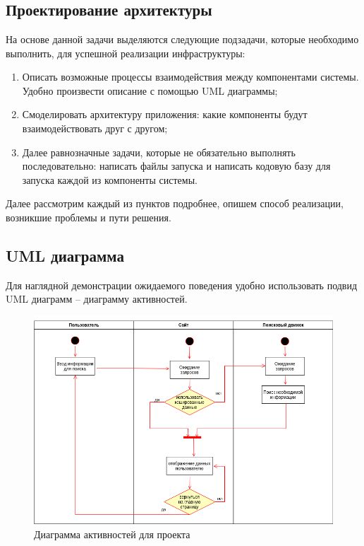 \chapter{\centering {}}
\label{cha:ch_2}

\section{Проектирование архитектуры}
На основе данной задачи выделяются следующие подзадачи, которые необходимо
выполнить, для успешной реализации инфраструктуры:
\begin{enumerate}[label=\arabic*.]
    \item Описать возможные процессы взаимодействия между компонентами системы.
        Удобно произвести описание с помощью UML диаграммы;
    \item Смоделировать архитектуру приложения: какие компоненты будут
        взаимодействовать друг с другом;
    \item Далее равнозначные задачи, которые не обязательно выполнять
        последовательно: написать файлы запуска и написать кодовую базу для
        запуска каждой из компоненты системы.
\end{enumerate}

Далее рассмотрим каждый из пунктов подробнее, опишем способ реализации,
возникшие проблемы и пути решения.

\section{UML диаграмма}
Для наглядной демонстрации ожидаемого поведения удобно использовать подвид UML диаграмм -- диаграмму активностей.
\begin{figure}[H]
    \centering
    \includegraphics[scale=0.55]{inc/img/activity_diagram.png}
    \caption{Диаграмма активностей для проекта}
\end{figure}

